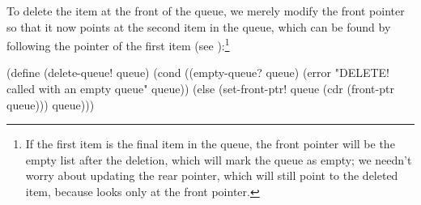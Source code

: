\noindent
To delete the item at the front of the queue, we merely modify the front
pointer so that it now points at the second item in the queue, which can be
found by following the  pointer of the first item (see
):\footnote{If the first item is the final item in the queue, the front
pointer will be the empty list after the deletion, which will mark the queue as
empty; we needn't worry about updating the rear pointer, which will still point
to the deleted item, because  looks only at the front
pointer.}

\begin{codeBlock}
(define (delete-queue! queue)
  (cond ((empty-queue? queue)
         (error
           "DELETE! called with an empty queue"
           queue))
        (else
          (set-front-ptr! queue
                          (cdr (front-ptr queue)))
          queue)))
\end{codeBlock}

